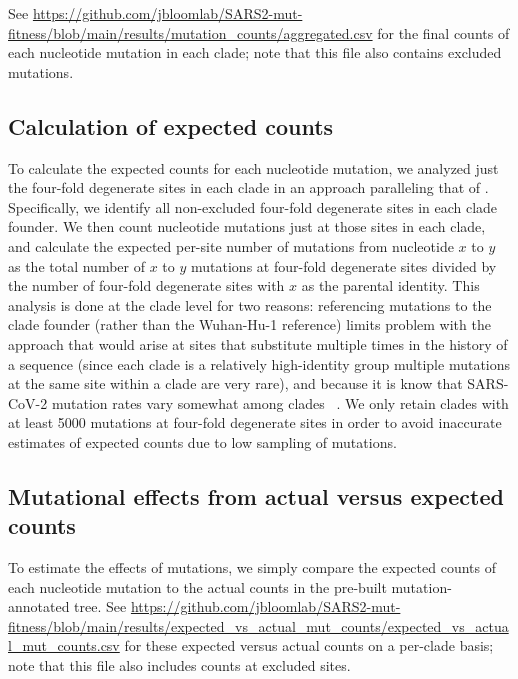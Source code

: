 \documentclass[9pt,twocolumn,twoside]{gsajnl_modified}
\providecommand{\DIFaddbegin}{} %
\providecommand{\DIFaddend}{} %
\providecommand{\DIFdelbegin}{} %
\providecommand{\DIFdelend}{} %
\begin{document}
{See \url{https://github.com/jbloomlab/SARS2-mut-fitness/blob/main/results/mutation_counts/aggregated.csv} for the final counts of each nucleotide mutation in each clade; note that this file also contains excluded mutations.

\subsection{Calculation of expected counts}
To calculate the expected counts for each nucleotide mutation, we analyzed just the four-fold degenerate sites in each clade in an approach paralleling that of \DIFdelbegin %
\DIFdelend \DIFaddbegin \cite{bloom2023evolution}\DIFaddend .
Specifically, we identify all non-excluded four-fold degenerate sites in each clade founder.
We then count nucleotide mutations just at those sites in each clade, and calculate the expected per-site number of mutations from nucleotide $x$ to $y$ as the total number of $x$ to $y$ mutations at four-fold degenerate sites divided by the number of four-fold degenerate sites with $x$ as the parental identity.
This analysis is done at the clade level for two reasons: referencing mutations to the clade founder (rather than the Wuhan-Hu-1 reference) limits problem with the approach that would arise at sites that substitute multiple times in the history of a sequence (since each clade is a relatively high-identity group multiple mutations at the same site within a clade are very rare), and because it is know that SARS-CoV-2 mutation rates vary somewhat among clades~\DIFdelbegin %
\DIFdelend \DIFaddbegin \citep{bloom2023evolution,ruis2022mutational}\DIFaddend .
We only retain clades with at least 5000 mutations at four-fold degenerate sites in order to avoid inaccurate estimates of expected counts due to low sampling of mutations.

\subsection{Mutational effects from actual versus expected counts}
To estimate the effects of mutations, we simply compare the expected counts of each nucleotide mutation to the actual counts in the pre-built mutation-annotated tree.
See \url{https://github.com/jbloomlab/SARS2-mut-fitness/blob/main/results/expected_vs_actual_mut_counts/expected_vs_actual_mut_counts.csv} for these expected versus actual counts on a per-clade basis; note that this file also includes counts at excluded sites.

}
\end{document}
